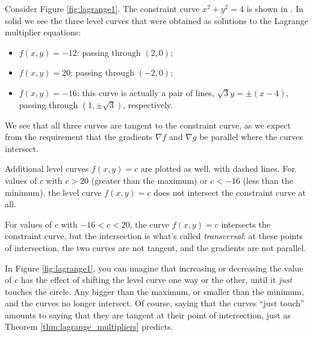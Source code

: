 {{\begin{center}
\end{center}
}
}

Consider Figure \ref{fig:lagrange1}. The constraint curve $x^2+y^2=4$ is shown in . In solid  we see the three level curves that were obtained as solutions to the Lagrange multiplier equations:
\begin{itemize}
\item $f(x,y)=-12$: passing through $(2,0)$;
\item $f(x,y)=20$: passing through $(-2,0)$;
\item $f(x,y)=-16$: this curve is actually a pair of lines, $\sqrt{3}y=\pm (x-4)$, passing through $(1,\pm\sqrt{3})$, respectively.
\end{itemize}

We see that all three curves are tangent to the constraint curve, as we expect from the requirement that the gradients $\nabla f$ and $\nabla g$ be parallel where the curves intersect.

Additional level curves $f(x,y)=c$ are plotted as well, with dashed lines. For values of $c$ with $c>20$ (greater than the maximum) or $c<-16$ (less than the minimum), the level curve $f(x,y)=c$ does not intersect the constraint curve at all.

For values of $c$ with $-16<c<20$, the curve $f(x,y)=c$ intersects the constraint curve, but the intersection is what's called \emph{transversal}: at these points of intersection, the two curves are not tangent, and the gradients are not parallel.

In Figure \ref{fig:lagrange1}, you can imagine that increasing or decreasing the value of $c$ has the effect of shifting the level curve one way or the other, until it \emph{just} touches the circle. Any bigger than the maximum, or smaller than the minimum, and the curves no longer intersect. Of course, saying that the curves ``just touch'' amounts to saying that they are tangent at their point of intersection, just as Theorem \ref{thm:lagrange_multipliers} predicts.\\

